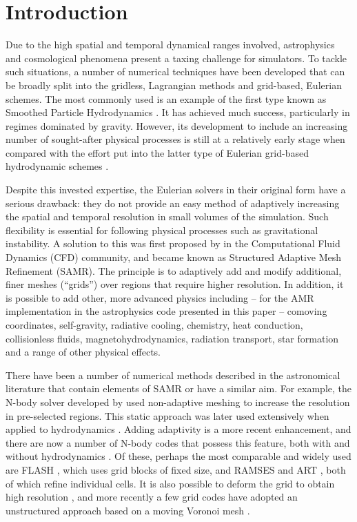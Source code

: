 \section{Introduction}\label{sec.intro}

Due to the high spatial and temporal dynamical ranges involved,
astrophysics and cosmological phenomena present a taxing challenge for
simulators. To tackle such situations, a number of numerical
techniques have been developed that can be broadly split into the
gridless, Lagrangian methods and grid-based, Eulerian schemes. The
most commonly used is an example of the first type known as Smoothed
Particle Hydrodynamics \citep[SPH;][]{Lucy77, SPH}. It has achieved
much success, particularly in regimes dominated by gravity. However,
its development to include an increasing number of sought-after
physical processes is still at a relatively early stage when compared
with the effort put into the latter type of Eulerian grid-based
hydrodynamic schemes \citep[e.g.,][]{laney-1998, toro-1997,
Woodward84}.

Despite this invested expertise, the Eulerian solvers in their
original form have a serious drawback: they do not provide an easy
method of adaptively increasing the spatial and temporal resolution in
small volumes of the simulation. Such flexibility is essential for
following physical processes such as gravitational instability. A
solution to this was first proposed by \citet{Berger89} in the
Computational Fluid Dynamics (CFD) community, and became known as
Structured Adaptive Mesh Refinement (SAMR). The principle is to
adaptively add and modify additional, finer meshes (``grids'') over
regions that require higher resolution. In addition, it is possible to
add other, more advanced physics including -- for the AMR
implementation in the astrophysics code presented in this paper --
comoving coordinates, self-gravity, radiative cooling, chemistry, heat
conduction, collisionless fluids, magnetohydrodynamics, radiation
transport, star formation and a range of other physical effects.
\newpage

There have been a number of numerical methods described in the
astronomical literature that contain elements of SAMR or have a
similar aim. For example, the N-body solver developed by
\citet{Villumsen89} used non-adaptive meshing to increase the
resolution in pre-selected regions. This static approach was later
used extensively when applied to hydrodynamics
\citep[e.g.,][]{Ruffert94, Anninos94}. Adding adaptivity is a more
recent enhancement, and there are now a number of N-body codes that
possess this feature, both with and without hydrodynamics
\citep{Couchman91, Jessop94, Suisalu95, Splinter96, Gelato97, ART97,
Truelove98, flash_method, MLAPM01, Yahagi01, RAMSES, Quilis04,
Ziegler05, Zhang06, Astrobear09, Pluto-amr, GAMER, Nyx}. Of these,
perhaps the most comparable and widely used are FLASH
\citep{flash_method}, which uses grid blocks of fixed size, and RAMSES
\citep{RAMSES} and ART \citep{ART97}, both of which refine individual
cells. It is also possible to deform the grid to obtain high
resolution \citep[e.g.,][]{Gnedin95, Xu97, Pen98}, and more recently a
few grid codes have adopted an unstructured approach based on a moving
Voronoi mesh \citep{Arepo10, Tess11}.

